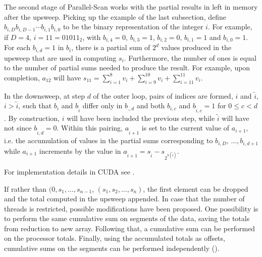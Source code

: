 The second stage of Parallel-Scan works with the partial results in left in memory after the upsweep. Picking up the example of the last subsection, define $b_{i,D}b_{i,D-1}\cdots b_{i,1}b_{i,0}$ to be the binary representation of the integer $i$. For example, if $D=4$, $i=11=01011_{2}$, with $b_{i,4}=0,\, b_{i,3}=1,\,b_{i,2}=0,\,b_{i,1}=1$ and $b_{i,0}=1$. For each $b_{i,d}=1$ in $b_i$, there is a partial sum of $2^d$ values produced in the upsweep that are used in computing $s_i$. Furthermore, the number of ones is equal to the number of partial sums needed to produce the result. For example, upon completion, $a_{12}$ will have $s_{11}=\sum_{i=1}^8 v_i + \sum_{i=9}^{10}v_i+\sum_{i=11}^{11}v_i$. 

In the downsweep, at step $d$ of the outer loop, pairs of indices are formed, $i$ and $\tilde{i}$, $i>\tilde{i}$, such that $b_i$ and $b_{\tilde{i}}$ differ only in $b_{.,d}$ and both $b_{i,c}$ and $b_{\tilde{i},c}=1$ for $0\le c<d$. By construction, $i$ will have been included the previous step, while $\tilde{i}$ will have not since $b_{\tilde{i},d}=0$. Within this pairing, $a_{\tilde{i}+1}$ is set to the current value of $a_{i+1}$, i.e. the accumulation of values in the partial sums corresponding to $b_{i,D},\, \ldots, b_{i,d+1}$ while $a_{i+1}$ increments by the value in $a_{\tilde{i}+1}=s_{\tilde{i}}-s_{2^{h(\tilde{i})}}$.


For implementation details in CUDA see \citet{harris-scan}.

If rather than $(0,s_1,\ldots,s_{n-1}$, $(s_1,s_2,\ldots,s_n)$, the first element can be dropped and the total computed in the upsweep appended. In case that the number of threads is restricted, possible modifications have been proposed. One possibility is to perform the same cumulative sum on segments of the data, saving the totals from reduction to new array. Following that, a cumulative sum can be performed on the processor totals. Finally, using the accumulated totals as offsets, cumulative sums on the segments can be performed independently (\cite{blelloch1990}).


